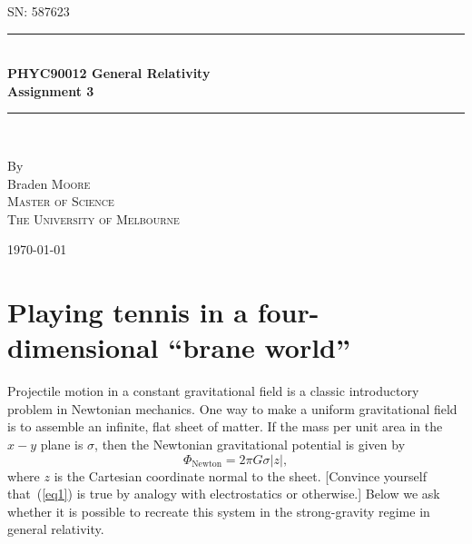 \documentclass[a4paper]{article} %
\begin{document}
\pagestyle{empty}

\newcommand{\HRule}{\rule{\linewidth}{0.5mm}}

\begin{titlepage}

    \begin{center}
        \textsc{\large SN: 587623}\\[6cm]

        \HRule \\[0.5cm]
		\Huge \textbf{PHYC90012 General Relativity}\\[0.5cm]
        \huge \textbf{Assignment 3}\\[0.5cm] 
        \HRule \\[1.5cm]
        \begin{minipage}{0.4\textwidth}
        \begin{center}

        \large By \\[0.75cm]
        \huge Braden \scshape Moore \\[0.5cm]
        \normalsize \normalfont Master of Science \\
        The University of Melbourne \\

        \end{center}
        \end{minipage}

        \vfill

        \large \today
    \end{center}

\newpage
\end{titlepage}
\pagestyle{fancy}
\lfoot{\textsc{\today}}
\setcounter{page}{1}
\setcounter{section}{2}
\section{Playing tennis in a four-dimensional ``brane world''}

\begin{framed}
Projectile motion in a constant gravitational field is a classic introductory problem in Newtonian mechanics. One way to make a uniform gravitational field is to assemble an infinite, flat sheet of matter. If the mass per unit area in the $x-y$ plane is $\sigma$, then the Newtonian gravitational potential is given by 
\begin{equation}
\Phi_{\text{Newton}}=2\pi G\sigma |z|,\label{eq1}
\end{equation}
where $z$ is the Cartesian coordinate normal to the sheet. [Convince yourself that~(\ref{eq1}) is true by analogy with electrostatics or otherwise.] Below we ask whether it is possible to recreate this system in the strong-gravity regime in general relativity.
\end{framed}
\end{document}
